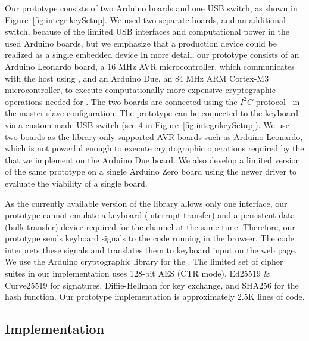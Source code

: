 Our \device prototype consists of two Arduino boards and one USB switch, as shown in Figure~\ref{fig:integrikeySetup}. We used two separate boards, and an additional switch, because of the limited USB interfaces and computational power in the used Arduino boards, but we emphasize that a production device could be realized as a single embedded device
In more detail, our \device prototype consists of an Arduino Leonardo board, a $16$ MHz AVR microcontroller, which communicates with the host using \webusb, and an Arduino Due, an $84$ MHz ARM Cortex-M3 microcontroller, to execute computationally more expensive cryptographic operations needed for \tls. The two boards are connected using the $I^2C$ protocol~\cite{i2c} in the master-slave configuration. The prototype can be connected to the keyboard via a custom-made USB switch (see $4$ in Figure~\ref{fig:integrikeySetup}). We use two boards as the \webusb library only supported AVR boards such as Arduino Leonardo, which is not powerful enough to execute cryptographic operations required by the \tls that we implement on the Arduino Due board. We also develop a limited version of the same prototype on a single Arduino Zero board using the newer driver to evaluate the viability of a single board.

As the currently available version of the \webusb library \cite{webusb} allows only one \usb interface, our prototype cannot emulate a keyboard (interrupt transfer) and a persistent data (bulk transfer) device required for the \tls channel at the same time. Therefore, our prototype sends keyboard signals to the \js code running in the browser. The \js code interprets these signals and translates them to keyboard input on the web page.
We use the Arduino cryptographic library for the \tls. The limited set of cipher suites in our \tls implementation uses 128-bit AES (CTR mode), Ed25519 \& Curve25519 for signatures, Diffie-Hellman for key exchange, and SHA256 for the hash function. Our prototype implementation is approximately 2.5K lines of code. 


\subsection{\server Implementation} 

